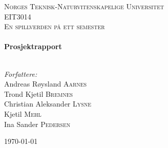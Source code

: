 
\begin{titlepage}

\begin{center}
 

\textsc{\LARGE Norges Teknisk-Naturvitenskapelige Universitet}\\[1.5cm]

 
\textsc{\Large EIT3014}\\[0.5cm]

\textsc{\large En spillverden på ett semester}\\[0.5cm]
 
 
\HRule \\[0.4cm]
{ \huge \bfseries Prosjektrapport}\\[0.4cm]
 
\HRule \\[1.5cm]
 

\begin{center} \Large
\emph{Forfattere:}\\
Andreas Røysland \textsc{Aarnes}\\
Trond Kjetil \textsc{Bremnes}\\
Christian Aleksander \textsc{Lysne}\\
Kjetil \textsc{Mehl}\\
Ina Sander \textsc{Pedersen}\\ [3cm]
\end{center}
 

{\large \today}\\[4cm] %
 
\vfill
\end{center}

\end{titlepage}
